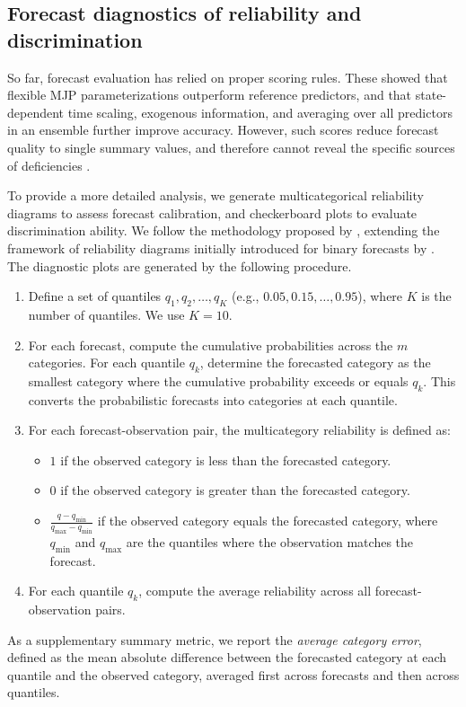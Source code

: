\subsection{Forecast diagnostics of reliability and discrimination} \label{sec:reliability_analysis}
So far, forecast evaluation has relied on proper scoring rules. These showed that flexible MJP parameterizations outperform reference predictors, and that state-dependent time scaling, exogenous information, and averaging over all predictors in an ensemble further improve accuracy. However, such scores reduce forecast quality to single summary values, and therefore cannot reveal the specific sources of deficiencies \citep{hamill1997,Dimitriadis_2024}.

To provide a more detailed analysis, we generate multicategorical reliability diagrams to assess forecast calibration, and checkerboard plots to evaluate discrimination ability.
We follow the methodology proposed by \citet{hamill1997}, extending the framework of reliability diagrams initially introduced for binary forecasts by \citet{wilks1995a}.
The diagnostic plots are generated by the following procedure.
\begin{enumerate}    
    \item Define a set of quantiles $q_1, q_2, \dots, q_K$ (e.g., $0.05, 0.15, \dots, 0.95$), where $K$ is the number of quantiles. We use $K = 10$.
    \item For each forecast, compute the cumulative probabilities across the $m$ categories. For each quantile $q_k$, determine the forecasted category as the smallest category where the cumulative probability exceeds or equals $q_k$. This converts the probabilistic forecasts into categories at each quantile.
    \item For each forecast-observation pair, the multicategory reliability is defined as:
    \begin{itemize}
        \item $1$ if the observed category is less than the forecasted category.
        \item $0$ if the observed category is greater than the forecasted category.
        \item $\frac{q - q_{\min}}{q_{\max} - q_{\min}}$ if the observed category equals the forecasted category, where $q_{\min}$ and $q_{\max}$ are the quantiles where the observation matches the forecast.
    \end{itemize}
    \item For each quantile $q_k$, compute the average reliability across all forecast-observation pairs.
\end{enumerate}
As a supplementary summary metric, we report the \textit{average category error}, defined as the mean absolute difference between the forecasted category at each quantile and the observed category, averaged first across forecasts and then across quantiles.

